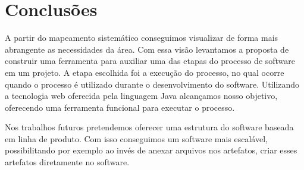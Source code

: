 \section{Conclusões}\label{conclusao}
A partir do mapeamento sistemático conseguimos visualizar de forma mais abrangente as necessidades da área. Com essa visão levantamos a proposta de construir uma ferramenta para auxiliar uma das etapas do processo de software em um projeto. A etapa escolhida foi a execução do processo, no qual ocorre quando o processo é utilizado durante o desenvolvimento do software. Utilizando a tecnologia web oferecida pela linguagem Java alcançamos nosso objetivo, oferecendo uma ferramenta funcional para executar o processo.

Nos trabalhos futuros pretendemos oferecer uma estrutura do software baseada em linha de produto. Com isso conseguimos um software mais escalável, possibilitando por exemplo ao invés de anexar arquivos nos artefatos, criar esses artefatos diretamente no software.